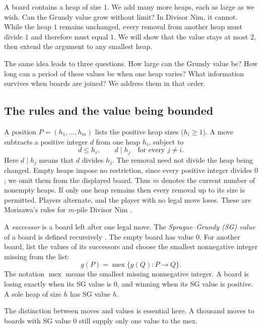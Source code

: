 \documentclass[10pt,a4paper]{article}
\DeclareMathOperator{\mex}{mex}
\begin{document}
A board contains a heap of size $1$. We add many more heaps, each as
large as we wish. Can the Grundy value grow without limit? In Divisor
Nim, it cannot. While the heap $1$ remains unchanged, every removal
from another heap must divide $1$ and therefore must equal $1$.
We will show that the value stays at most $2$, then extend the argument
to any smallest heap.

The same idea leads to three questions. How large can the Grundy
value be? How long can a period of these values be when one heap
varies? What information survives when boards are joined? We address
them in that order.

\subsection{The rules and the value being bounded}

A position $P=(h_1,\ldots,h_m)$ lists the positive heap sizes ($h_i \ge 1$).
A move subtracts a positive integer $d$ from one heap $h_i$, subject to
\begin{equation}
 d\le h_i,\qquad d\mid h_j\quad\text{for every }j\ne i.
 \label{eq:rule}
\end{equation}
Here $d\mid h_j$ means that $d$ divides $h_j$. The removal need not
divide the heap being changed. Empty heaps impose no restriction,
since every positive integer divides $0$; we omit them from the displayed
board. Thus $m$ denotes the current number of nonempty heaps.
If only one heap remains then every removal up to its size is permitted.
Players alternate, and the player with no legal move loses.
These are Morisawa's rules for $m$-pile Divisor Nim
\cite{Morisawa2026}.

A \emph{successor} is a board left after one legal move.
The \emph{Sprague--Grundy (SG) value} of a board is defined recursively
\cite{Siegel2013}. The empty board has value $0$. For another board, list the values of its successors and choose the smallest nonnegative integer missing from the list:
\begin{equation}
 g(P)=\mex\{g(Q):P\longrightarrow Q\}.
 \label{eq:mex}
\end{equation}
The notation $\mex$ means the smallest missing nonnegative integer.
A board is losing exactly when its SG value is $0$, and winning
when its SG value is positive. A sole heap of size $h$ has
SG value $h$.

The distinction between moves and values is essential here.
A thousand moves to boards with SG value $0$ still supply only
one value to the mex.
\end{document}
